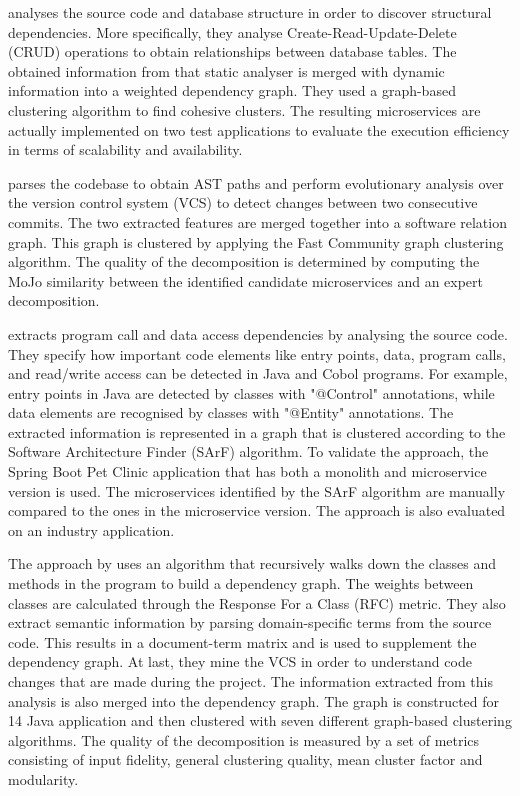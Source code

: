\citeauthor{de2018function} \cite{de2018function} analyses the source code and database structure in order to discover structural dependencies. More specifically, they analyse Create-Read-Update-Delete (CRUD) operations to obtain relationships between database tables. The obtained information from that static analyser is merged with dynamic information into a weighted dependency graph. They used a graph-based clustering algorithm to find cohesive clusters. The resulting microservices are actually implemented on two test applications to evaluate the execution efficiency in terms of scalability and availability. \par
\citeauthor{eski2018automatic} \cite{eski2018automatic} parses the codebase to obtain AST paths and perform evolutionary analysis over the version control system (VCS) to detect changes between two consecutive commits. The two extracted features are merged together into a software relation graph. This graph is clustered by applying the Fast Community graph clustering algorithm. The quality of the decomposition is determined by computing the MoJo similarity between the identified candidate microservices and an expert decomposition. \par
\citeauthor{kamimura2018extracting} \cite{kamimura2018extracting} extracts program call and data access dependencies by analysing the source code. They specify how important code elements like entry points, data, program calls, and read/write access can be detected in Java and Cobol programs. For example, entry points in Java are detected by classes with "@Control" annotations, while data elements are recognised by classes with "@Entity" annotations. The extracted information is represented in a graph that is clustered according to the Software Architecture Finder (SArF) algorithm. To validate the approach, the Spring Boot Pet Clinic application that has both a monolith and microservice version is used. The microservices identified by the SArF algorithm are manually compared to the ones in the microservice version. The approach is also evaluated on an industry application. \par
The approach by \citeauthor{lohnertz2020steinmetz} \cite{lohnertz2020steinmetz} uses an algorithm that recursively walks down the classes and methods in the program to build a dependency graph. The weights between classes are calculated through the Response For a Class (RFC) metric. They also extract semantic information by parsing domain-specific terms from the source code. This results in a document-term matrix and is used to supplement the dependency graph. At last, they mine the VCS in order to understand code changes that are made during the project. The information extracted from this analysis is also merged into the dependency graph. The graph is constructed for 14 Java application and then clustered with seven different graph-based clustering algorithms. The quality of the decomposition is measured by a set of metrics consisting of input fidelity, general clustering quality, mean cluster factor and modularity.  \par
